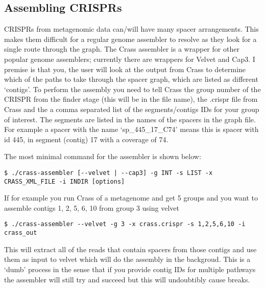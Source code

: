 \documentclass[11pt]{article} %
\begin{document}
\subsection{Assembling CRISPRs}
CRISPRs from metagenomic data can/will have many spacer arrangements.  
This makes them difficult for a regular genome assembler to resolve as they look for a single route through the graph.   
The Crass assembler is a wrapper for other popular genome assemblers; currently there are wrappers for Velvet and Cap3.  
I premise is that you, the user will look at the output from Crass to determine which of the paths to take through the spacer graph, which are listed as different `contigs'. 
To perform the assembly you need to tell Crass the group number of the CRISPR from the finder stage (this will be in the file name), the .crispr file from Crass and the a comma separated list of the segments/contigs IDs for your group of interest.  
The segments are listed in the names of the spacers in the graph file.  
For example a spacer with the name `sp\_445\_17\_C74' means this is spacer with id 445, in segment (contig) 17 with a coverage of 74.

  The most minimal command for the assembler is shown below: 
 \begin{lstlisting}[style=BashInputStyle]
    $ ./crass-assembler [--velvet | --cap3] -g INT -s LIST -x CRASS_XML_FILE -i INDIR [options]
\end{lstlisting}
 If for example you run Crass of a metagenome and get 5 groups and you want to assemble contigs 1, 2, 5, 6, 10 from group 3 using velvet
 \begin{lstlisting}[style=BashInputStyle]
	$ ./crass-assembler --velvet -g 3 -x crass.crispr -s 1,2,5,6,10 -i crass_out
\end{lstlisting}

This will extract all of the reads that contain spacers from those contigs and use them as input to velvet which will do the assembly in the backgroud.  This is a `dumb' process in the sense that if you provide contig IDs for multiple pathways the assembler will still try and succeed but this will undoubtibly cause breaks. 
\end{document}
